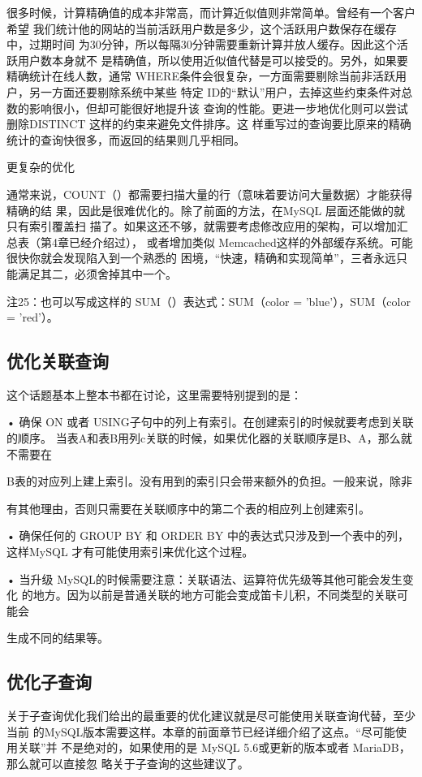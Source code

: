 很多时候，计算精确值的成本非常高，而计算近似值则非常简单。曾经有一个客户希望
我们统计他的网站的当前活跃用户数是多少，这个活跃用户数保存在缓存中，过期时间
为30分钟，所以每隔30分钟需要重新计算并放人缓存。因此这个活跃用户数本身就不
是精确值，所以使用近似值代替是可以接受的。另外，如果要精确统计在线人数，通常
WHERE条件会很复杂，一方面需要剔除当前非活跃用户，另一方面还要剔除系统中某些
特定 ID的“默认”用户，去掉这些约束条件对总数的影响很小，但却可能很好地提升该
查询的性能。更进一步地优化则可以尝试删除DISTINCT 这样的约束来避免文件排序。这
样重写过的查询要比原来的精确统计的查询快很多，而返回的结果则几乎相同。

更复杂的优化

通常来说，COUNT（）都需要扫描大量的行（意味着要访问大量数据）才能获得精确的结
果，因此是很难优化的。除了前面的方法，在MySQL 层面还能做的就只有索引覆盖扫
描了。如果这还不够，就需要考虑修改应用的架构，可以增加汇总表（第4章已经介绍过），
或者增加类似 Memcached这样的外部缓存系统。可能很快你就会发现陷入到一个熟悉的
困境，“快速，精确和实现简单”，三者永远只能满足其二，必须舍掉其中一个。

注25：也可以写成这样的 SUM（）表达式：SUM（color = 'blue'），SUM（color = 'red'）。

\subsection{优化关联查询}
这个话题基本上整本书都在讨论，这里需要特别提到的是：

• 确保 ON 或者 USING子句中的列上有索引。在创建索引的时候就要考虑到关联的顺序。
当表A和表B用列c关联的时候，如果优化器的关联顺序是B、A，那么就不需要在

B表的对应列上建上索引。没有用到的索引只会带来额外的负担。一般来说，除非

有其他理由，否则只需要在关联顺序中的第二个表的相应列上创建索引。

• 确保任何的 GROUP BY 和 ORDER BY 中的表达式只涉及到一个表中的列，这样MySQL
才有可能使用索引来优化这个过程。

• 当升级 MySQL的时候需要注意：关联语法、运算符优先级等其他可能会发生变化
的地方。因为以前是普通关联的地方可能会变成笛卡儿积，不同类型的关联可能会

生成不同的结果等。

\subsection{优化子查询}
关于子查询优化我们给出的最重要的优化建议就是尽可能使用关联查询代替，至少当前
的MySQL版本需要这样。本章的前面章节已经详细介绍了这点。“尽可能使用关联”并
不是绝对的，如果使用的是 MySQL 5.6或更新的版本或者 MariaDB，那么就可以直接忽
略关于子查询的这些建议了。

